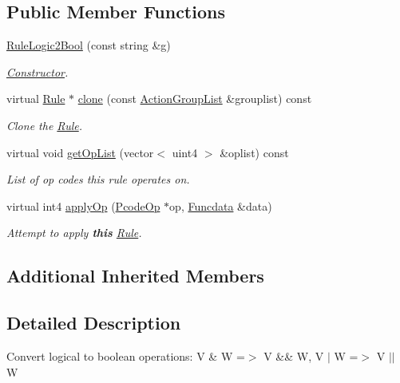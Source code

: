 \subsection*{Public Member Functions}
\begin{DoxyCompactItemize}
\item 
\mbox{\hyperlink{class_rule_logic2_bool_a6eccf6ebdd5c2ace03540bbaa1d89cdf}{Rule\+Logic2\+Bool}} (const string \&g)
\begin{DoxyCompactList}\small\item\em \mbox{\hyperlink{class_constructor}{Constructor}}. \end{DoxyCompactList}\item 
virtual \mbox{\hyperlink{class_rule}{Rule}} $\ast$ \mbox{\hyperlink{class_rule_logic2_bool_af9afc3c788caa59905c4a79a77c3b06d}{clone}} (const \mbox{\hyperlink{class_action_group_list}{Action\+Group\+List}} \&grouplist) const
\begin{DoxyCompactList}\small\item\em Clone the \mbox{\hyperlink{class_rule}{Rule}}. \end{DoxyCompactList}\item 
virtual void \mbox{\hyperlink{class_rule_logic2_bool_a9058e18528bd8d56f16814b18f0bd099}{get\+Op\+List}} (vector$<$ uint4 $>$ \&oplist) const
\begin{DoxyCompactList}\small\item\em List of op codes this rule operates on. \end{DoxyCompactList}\item 
virtual int4 \mbox{\hyperlink{class_rule_logic2_bool_a1e63e4098d4474ca67d56d4e0118fb82}{apply\+Op}} (\mbox{\hyperlink{class_pcode_op}{Pcode\+Op}} $\ast$op, \mbox{\hyperlink{class_funcdata}{Funcdata}} \&data)
\begin{DoxyCompactList}\small\item\em Attempt to apply {\bfseries{this}} \mbox{\hyperlink{class_rule}{Rule}}. \end{DoxyCompactList}\end{DoxyCompactItemize}
\subsection*{Additional Inherited Members}


\subsection{Detailed Description}
Convert logical to boolean operations\+: {\ttfamily V \& W =$>$ V \&\& W, V $\vert$ W =$>$ V $\vert$$\vert$ W} 


